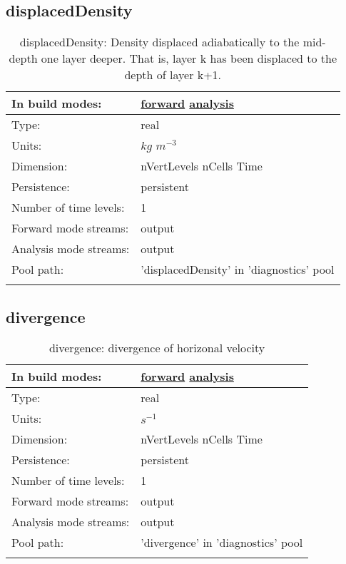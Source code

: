 \subsection[displacedDensity]{displacedDensity}
\label{subsec:var_sec_diagnostics_displacedDensity}
\begin{center}
\begin{longtable}{| p{2.0in} | p{4.0in} |}
        \hline 
        In build modes: & \hyperref[subsec:forward_var_tab_diagnostics]{forward} \hyperref[subsec:analysis_var_tab_diagnostics]{analysis} \\
        \hline 
        Type: & real \\
        \hline 
        Units: & $kg$ $m^{-3}$ \\
        \hline 
        Dimension: & nVertLevels nCells Time \\
        \hline 
        Persistence: & persistent \\
        \hline 
        Number of time levels: & 1 \\
        \hline 
		 Forward mode streams: &  output \\
        \hline 
		 Analysis mode streams: &  output \\
        \hline 
            Pool path: & 'displacedDensity' in 'diagnostics' pool
 \\
		 \hline 
    \caption{displacedDensity: Density displaced adiabatically to the mid-depth one layer deeper.  That is, layer k has been displaced to the depth of layer k+1.}
\end{longtable}
\end{center}
\subsection[divergence]{divergence}
\label{subsec:var_sec_diagnostics_divergence}
\begin{center}
\begin{longtable}{| p{2.0in} | p{4.0in} |}
        \hline 
        In build modes: & \hyperref[subsec:forward_var_tab_diagnostics]{forward} \hyperref[subsec:analysis_var_tab_diagnostics]{analysis} \\
        \hline 
        Type: & real \\
        \hline 
        Units: & $s^{-1}$ \\
        \hline 
        Dimension: & nVertLevels nCells Time \\
        \hline 
        Persistence: & persistent \\
        \hline 
        Number of time levels: & 1 \\
        \hline 
		 Forward mode streams: &  output \\
        \hline 
		 Analysis mode streams: &  output \\
        \hline 
            Pool path: & 'divergence' in 'diagnostics' pool
 \\
		 \hline 
    \caption{divergence: divergence of horizonal velocity}
\end{longtable}
\end{center}
